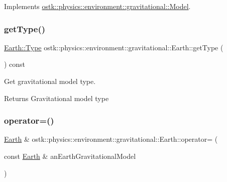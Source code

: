 Implements \hyperlink{classostk_1_1physics_1_1environment_1_1gravitational_1_1_model_a5ef3b4ddf4240e8a26553294fe392581}{ostk\+::physics\+::environment\+::gravitational\+::\+Model}.

\mbox{\label{classostk_1_1physics_1_1environment_1_1gravitational_1_1_earth_aa65dd2a5ce980e8a4f7f502387c1ff61}} 
\subsubsection{\texorpdfstring{get\+Type()}{getType()}}
{\footnotesize\ttfamily \hyperlink{classostk_1_1physics_1_1environment_1_1gravitational_1_1_earth_a9895df78b5c5aab5e981bf765f8c0f05}{Earth\+::\+Type} ostk\+::physics\+::environment\+::gravitational\+::\+Earth\+::get\+Type (\begin{DoxyParamCaption}{ }\end{DoxyParamCaption}) const}



Get gravitational model type. 

\begin{DoxyReturn}{Returns}
Gravitational model type 
\end{DoxyReturn}
\mbox{\label{classostk_1_1physics_1_1environment_1_1gravitational_1_1_earth_accc913e0c0a5c7c8348c13217c5de4f3}} 
\subsubsection{\texorpdfstring{operator=()}{operator=()}}
{\footnotesize\ttfamily \hyperlink{classostk_1_1physics_1_1environment_1_1gravitational_1_1_earth}{Earth} \& ostk\+::physics\+::environment\+::gravitational\+::\+Earth\+::operator= (\begin{DoxyParamCaption}\item[{const \hyperlink{classostk_1_1physics_1_1environment_1_1gravitational_1_1_earth}{Earth} \&}]{an\+Earth\+Gravitational\+Model }\end{DoxyParamCaption})}



